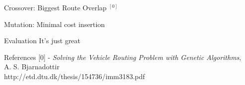 \documentclass[ %
                    author={Callum Mann},
                     title={Genetic algorithm for the CVRP},
                  subtitle={Capacitated Vehicle Routing Problem},
                      type={Heuristic},
                      year={2016}]{poster}
\begin{document}
\begin{frame}{}
\begin{columns}[t]
\begin{column}{0.450\linewidth}
    \vfill

    \begin{block}{\Large Crossover: Biggest Route Overlap $^{[0]}$}
      \vspace{10cm}
    \end{block}
    \vspace{1cm}

    \begin{block}{\Large Mutation: Minimal cost insertion}
      \vspace{10cm}
    \end{block}
    \vspace{1cm}

    \begin{block}{\Large Evaluation}
      It's just great
    \end{block}

    \begin{block}{\Large References}
      [0] - \textit{Solving the Vehicle Routing Problem with Genetic Algorithms}, \\ A. S. Bjarnadottir \\
      http://etd.dtu.dk/thesis/154736/imm3183.pdf
    \end{block}
    \vspace{1cm}
  \end{column}
\end{columns}

\vfill

\end{frame}

\end{document}
